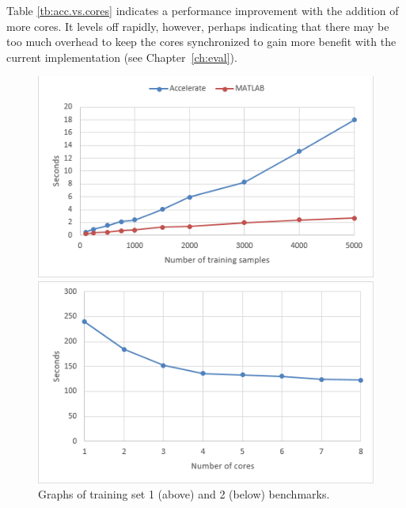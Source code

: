 \begin{table}
\centering
{}
	\caption{Benchmarking training set 2.}
	\label{tb:acc.vs.cores}
\end{table}

Table \ref{tb:acc.vs.cores} indicates a performance improvement with the addition of more cores. It levels off rapidly, however, perhaps indicating that there may be too much overhead to keep the cores synchronized to gain more benefit with the current implementation (see Chapter~\ref{ch:eval}).

\begin{figure}
	\centerline{\includegraphics{training1.png}}
	
	\centerline{\includegraphics{training2.png}}
	\caption{Graphs of training set 1 (above) and 2 (below) benchmarks.}
	\label{fig:traininggraphs}
\end{figure}
